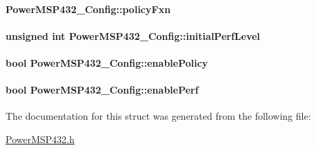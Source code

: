 \paragraph[{policy\+Fxn}]{ Power\+M\+S\+P432\+\_\+\+Config\+::policy\+Fxn}\label{struct_power_m_s_p432___config_a1d97cab94fba9efb95b42d61ff333bae}
\paragraph[{initial\+Perf\+Level}]{\setlength{\rightskip}{0pt plus 5cm}unsigned int Power\+M\+S\+P432\+\_\+\+Config\+::initial\+Perf\+Level}\label{struct_power_m_s_p432___config_a45d076ae535718fb18260b12b1e625b7}
\paragraph[{enable\+Policy}]{\setlength{\rightskip}{0pt plus 5cm}bool Power\+M\+S\+P432\+\_\+\+Config\+::enable\+Policy}\label{struct_power_m_s_p432___config_af3e984cb1b24646b510472362aef4d32}
\paragraph[{enable\+Perf}]{\setlength{\rightskip}{0pt plus 5cm}bool Power\+M\+S\+P432\+\_\+\+Config\+::enable\+Perf}\label{struct_power_m_s_p432___config_aba4bb1729e7387514d47f7e6fb6fb09d}


The documentation for this struct was generated from the following file\+:\begin{DoxyCompactItemize}
\item 
\hyperlink{_power_m_s_p432_8h}{Power\+M\+S\+P432.\+h}\end{DoxyCompactItemize}
